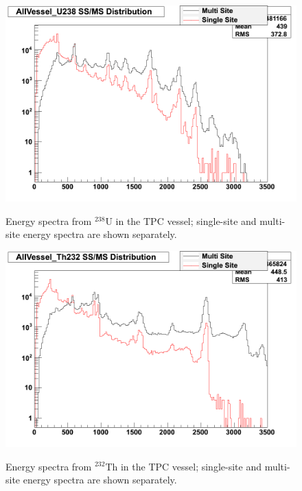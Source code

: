 \begin{figure}
\begin{center}
\includegraphics[keepaspectratio=true,width=\textwidth]{AllVessel_U238_single_multi_site_spec.png}
\end{center}
\renewcommand{\baselinestretch}{1}
\small\normalsize
\begin{quote}
\caption{Energy spectra from $^{238}$U in the TPC vessel; single-site and multi-site energy spectra are shown separately.~\cite{MCDocumentRun2a}}
\label{fig:UGeantSpectra}
\end{quote}
\end{figure}
\renewcommand{\baselinestretch}{2}
\small\normalsize

\begin{figure}
\begin{center}
\includegraphics[keepaspectratio=true,width=\textwidth]{AllVessel_Th232_single_multi_site_spec.png}
\end{center}
\renewcommand{\baselinestretch}{1}
\small\normalsize
\begin{quote}
\caption{Energy spectra from $^{232}$Th in the TPC vessel; single-site and multi-site energy spectra are shown separately.~\cite{MCDocumentRun2a}}
\label{fig:ThGeantSpectra}
\end{quote}
\end{figure}
\renewcommand{\baselinestretch}{2}
\small\normalsize


